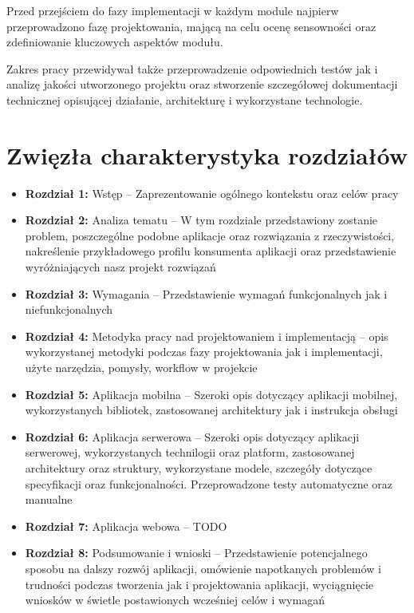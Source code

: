 \documentclass[a4paper,twoside,12pt]{book}
\begin{document}
Przed przejściem do fazy implementacji w każdym module najpierw przeprowadzono fazę projektowania, mającą na celu ocenę sensowności oraz zdefiniowanie kluczowych aspektów modułu. 

Zakres pracy przewidywał także przeprowadzenie odpowiednich testów jak i analizę jakości utworzonego projektu oraz stworzenie szczegółowej dokumentacji technicznej opisującej działanie, architekturę i wykorzystane technologie.

\newpage

\section{Zwięzła charakterystyka rozdziałów}
\begin{itemize}
    \item \textbf{Rozdział 1:} Wstęp -- Zaprezentowanie ogólnego kontekstu oraz celów pracy
    \item \textbf{Rozdział 2:} Analiza tematu -- W tym rozdziale przedstawiony zostanie problem, poszczególne podobne aplikacje oraz rozwiązania z rzeczywistości, nakreślenie przykładowego profilu konsumenta aplikacji oraz przedstawienie wyróżniających nasz projekt rozwiązań
    \item \textbf{Rozdział 3:} Wymagania -- Przedstawienie wymagań funkcjonalnych jak i niefunkcjonalnych
    \item \textbf{Rozdział 4:} Metodyka pracy nad projektowaniem i implementacją -- opis wykorzystanej metodyki podczas fazy projektowania jak i implementacji, użyte narzędzia, pomysły, workflow w projekcie
    \item \textbf{Rozdział 5:} Aplikacja mobilna -- Szeroki opis dotyczący aplikacji mobilnej, wykorzystanych bibliotek, zastosowanej architektury jak i instrukcja obsługi
    \item \textbf{Rozdział 6:} Aplikacja serwerowa -- Szeroki opis dotyczący aplikacji serwerowej, wykorzystanych technilogii oraz platform, zastosowanej architektury  oraz struktury, wykorzystane modele, szczegóły dotyczące specyfikacji oraz funkcjonalności. Przeprowadzone testy automatyczne oraz manualne
    \item \textbf{Rozdział 7:} Aplikacja webowa -- TODO
    \item \textbf{Rozdział 8:} Podsumowanie i wnioski -- Przedstawienie potencjalnego sposobu na dalszy rozwój aplikacji, omówienie napotkanych problemów i trudności podczas tworzenia jak i projektowania aplikacji, wyciągnięcie wniosków w świetle postawionych wcześniej celów i wymagań
\end{itemize}
\end{document}
